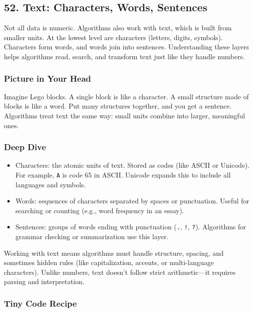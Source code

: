 \documentclass[
  letterpaper,
  DIV=11,
  numbers=noendperiod]{scrreprt}
\providecommand{\tightlist}{%
  \setlength{\itemsep}{0pt}\setlength{\parskip}{0pt}}
\begin{document}
\subsection{52. Text: Characters, Words,
Sentences}\label{text-characters-words-sentences}

Not all data is numeric. Algorithms also work with text, which is built
from smaller units. At the lowest level are characters (letters, digits,
symbols). Characters form words, and words join into sentences.
Understanding these layers helps algorithms read, search, and transform
text just like they handle numbers.

\subsubsection{Picture in Your Head}\label{picture-in-your-head-51}

Imagine Lego blocks. A single block is like a character. A small
structure made of blocks is like a word. Put many structures together,
and you get a sentence. Algorithms treat text the same way: small units
combine into larger, meaningful ones.

\subsubsection{Deep Dive}\label{deep-dive-21}

\begin{itemize}
\tightlist
\item
  Characters: the atomic units of text. Stored as codes (like ASCII or
  Unicode). For example, \texttt{\textquotesingle{}A\textquotesingle{}}
  is code 65 in ASCII. Unicode expands this to include all languages and
  symbols.
\item
  Words: sequences of characters separated by spaces or punctuation.
  Useful for searching or counting (e.g., word frequency in an essay).
\item
  Sentences: groups of words ending with punctuation (\texttt{.},
  \texttt{!}, \texttt{?}). Algorithms for grammar checking or
  summarization use this layer.
\end{itemize}

Working with text means algorithms must handle structure, spacing, and
sometimes hidden rules (like capitalization, accents, or multi-language
characters). Unlike numbers, text doesn't follow strict arithmetic---it
requires parsing and interpretation.

\subsubsection{Tiny Code Recipe}\label{tiny-code-recipe-49}
\end{document}
